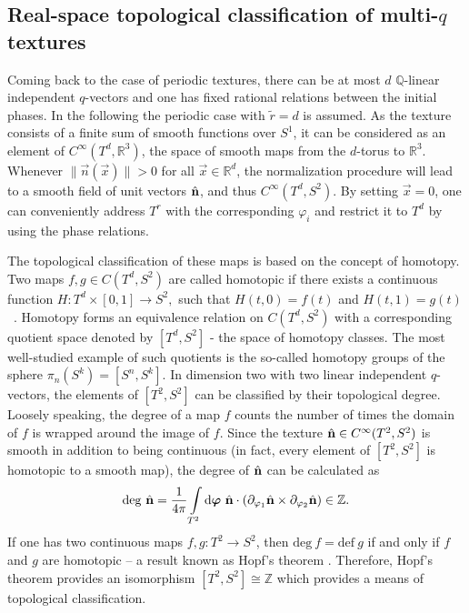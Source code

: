 \documentclass[submission, Phys]{SciPost}
\begin{document}
\subsection{Real-space topological classification of multi-\texorpdfstring{$q$}{q} textures}
\label{subsec:real_space_classification}

Coming back to the case of periodic textures, there can be at most $d$ $\mathbb{Q}$-linear independent $q$-vectors and one has fixed rational relations between the initial phases.
In the following the periodic case with $\tilde{r}=d$ is assumed.
As the texture consists of a finite sum of smooth functions over $S^1$, it can be considered as an element of $C^\infty(T^d, \mathbb{R}^3)$, the space of smooth maps from the $d$-torus to $\mathbb{R}^3$.
Whenever $\| \vec{n}(\vec{x}) \| > 0 $ for all $\vec{x} \in \mathbb{R}^d$, the normalization procedure will lead to a smooth field of unit vectors $\hat{\mathbf{n}}$, and thus $C^\infty(T^d, S^2)$.
By setting $\vec{x}=0$, one can conveniently address $T^r$ with the corresponding $\varphi_i$ and restrict it to $T^d$ by using the phase relations.

The topological classification of these maps is based on the concept of homotopy.
Two maps $f,g \in C(T^d, S^2)$ are called homotopic if there exists a continuous function
$
    H\colon T^d\times [0,1] \to S^2,
$
such that $H(t,0) = f(t)$ and $H(t,1)=g(t)$~\cite[Ch.~7]{Lee2010}. Homotopy forms an equivalence relation on $C(T^d, S^2)$ with a corresponding quotient space denoted by $[T^d, S^2]$ - the space of homotopy classes.
The most well-studied example of such quotients is the so-called homotopy groups of the sphere $\pi_n(S^k) = [S^n, S^k]$.
In dimension two with two linear independent $q$-vectors, the elements of $[T^2, S^2]$ can be classified by their topological degree.
Loosely speaking, the degree of a map $f$ counts the number of times the domain of $f$ is wrapped around the image of $f$. 
Since the texture $\hat{\mathbf{n}} \in C^\infty(T^2,S^2)$ is smooth in addition to being continuous (in fact, every element of $[T^2, S^2]$ is homotopic to a smooth map), the degree of $\hat{\mathbf{n}}$ can be calculated as \cite[Thm.~17.35]{Lee2012}
\begin{align}
    \mathrm{deg}~ \hat{\mathbf{n}} = \frac{1}{4 \pi } \int\limits_{T^2} \mathrm{d} \boldsymbol{\varphi} ~\hat{\mathbf{n}} \cdot( \partial_{\varphi_1} \hat{\mathbf{n}} \times \partial_{\varphi_2} \hat{\mathbf{n}}) 
    \in \mathbb{Z}.
    \label{eq:degree}
\end{align}
If one has two continuous maps $f,g \colon T^2 \to S^2$, then $\mathrm{deg}~f = \mathrm{def}~g$ if and only if $f$ and $g$ are homotopic -- a result known as Hopf's theorem \cite[p.~51]{Milnor1965}. 
Therefore, Hopf's theorem provides an isomorphism $[T^2, S^2] \cong \mathbb{Z}$ which provides a means of topological classification.
\end{document}
